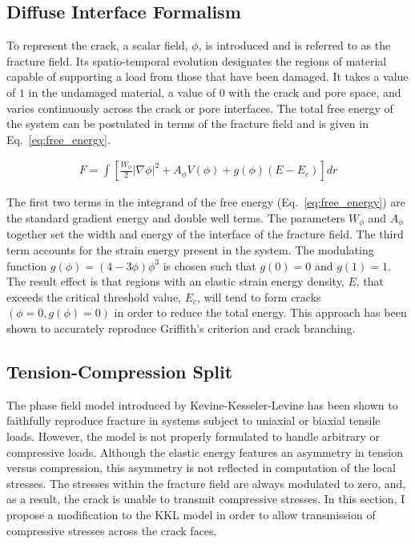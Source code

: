 \subsection{Diffuse Interface Formalism}
 
To represent the crack, a scalar field, $\phi$, is introduced and is referred to as the fracture field. Its spatio-temporal evolution designates the regions of material capable of supporting a load from those that have been damaged. It takes a value of $1$ in the undamaged material, a value of $0$ with the crack and pore space, and varies continuously across the crack or pore interfaces. The total free energy of the system can be postulated in terms of the fracture field and is given in Eq.~\ref{eq:free_energy}.

\begin{align}\label{eq:free_energy}
F = \int \left[ \frac{W_{\phi}}{2}|\nabla\phi|^2 + A_{\phi}V(\phi) + g(\phi)(E - E_c)\right]dr	
\end{align}

The first two terms in the integrand of the free energy (Eq.~\ref{eq:free_energy}) are the standard gradient energy and double well terms. The parameters $W_{\phi}$ and $A_{\phi}$ together set the width and energy of the interface of the fracture field. The third term accounts for the strain energy present in the system. The modulating function $g(\phi) = (4-3\phi)\phi^3$ is chosen such that $g(0)=0$ and $g(1)=1$. The result effect is that regions with an elastic strain energy density, $E$, that exceeds the critical threshold value, $E_c$, will tend to form cracks $(\phi=0, g(\phi)=0)$ in order to reduce the total energy. This approach has been shown to accurately reproduce Griffith's criterion and crack branching.



\subsection{Tension-Compression Split}

The phase field model introduced by Kevine-Kesseler-Levine has been shown to faithfully reproduce fracture in systems subject to uniaxial or biaxial tensile loads. However, the model is not properly formulated to handle arbitrary or compressive loads. Although the elastic energy features an asymmetry in tension versus compression, this asymmetry is not reflected in computation of the local stresses. The stresses within the fracture field are always modulated to zero, and, as a result, the crack is unable to transmit compressive stresses. In this section, I propose a modification to the KKL model in order to allow transmission of compressive stresses across the crack faces.

